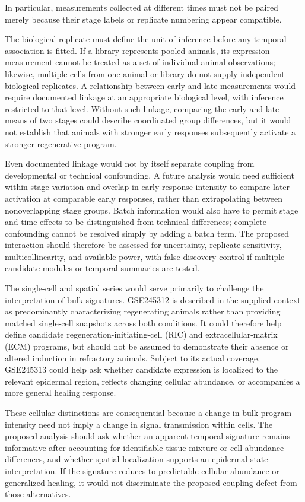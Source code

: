 \documentclass[11pt]{article}
\begin{document}
In particular, measurements collected at different times must not be paired merely because their stage labels or replicate numbering appear compatible.

The biological replicate must define the unit of inference before any temporal association is fitted. If a library represents pooled animals, its expression measurement cannot be treated as a set of individual-animal observations; likewise, multiple cells from one animal or library do not supply independent biological replicates. A relationship between early and late measurements would require documented linkage at an appropriate biological level, with inference restricted to that level. Without such linkage, comparing the early and late means of two stages could describe coordinated group differences, but it would not establish that animals with stronger early responses subsequently activate a stronger regenerative program.

Even documented linkage would not by itself separate coupling from developmental or technical confounding. A future analysis would need sufficient within-stage variation and overlap in early-response intensity to compare later activation at comparable early responses, rather than extrapolating between nonoverlapping stage groups. Batch information would also have to permit stage and time effects to be distinguished from technical differences; complete confounding cannot be resolved simply by adding a batch term. The proposed interaction should therefore be assessed for uncertainty, replicate sensitivity, multicollinearity, and available power, with false-discovery control if multiple candidate modules or temporal summaries are tested.

The single-cell and spatial series would serve primarily to challenge the interpretation of bulk signatures. GSE245312 is described in the supplied context as predominantly characterizing regenerating animals rather than providing matched single-cell snapshots across both conditions. It could therefore help define candidate regeneration-initiating-cell (RIC) and extracellular-matrix (ECM) programs, but should not be assumed to demonstrate their absence or altered induction in refractory animals. Subject to its actual coverage, GSE245313 could help ask whether candidate expression is localized to the relevant epidermal region, reflects changing cellular abundance, or accompanies a more general healing response.

These cellular distinctions are consequential because a change in bulk program intensity need not imply a change in signal transmission within cells. The proposed analysis should ask whether an apparent temporal signature remains informative after accounting for identifiable tissue-mixture or cell-abundance differences, and whether spatial localization supports an epidermal-state interpretation. If the signature reduces to predictable cellular abundance or generalized healing, it would not discriminate the proposed coupling defect from those alternatives.
\end{document}

